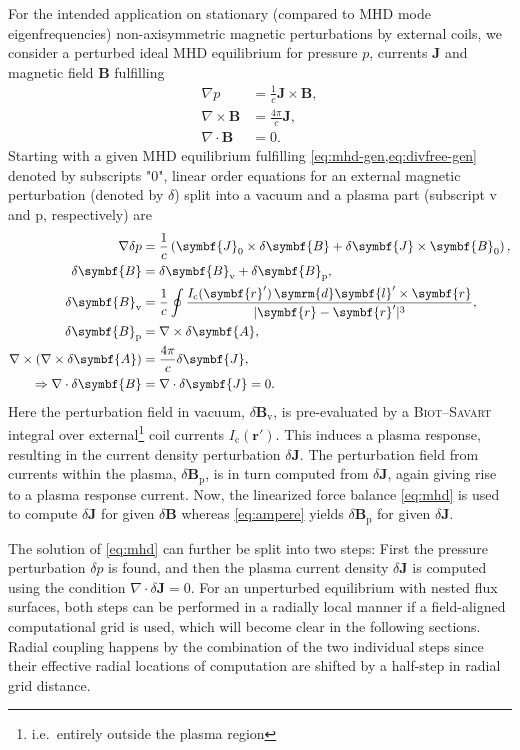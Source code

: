 \documentclass[a4paper, twoside, 10pt, english]{article}
\numberwithin{equation}{section}
\let\vec\symbf
\newcommand*\grad{\ensuremath{\nabla}}
\newcommand*\divg{\ensuremath{\nabla \cdot}}
\newcommand*\curl{\ensuremath{\nabla \times}}
\newcommand*\diff{\ensuremath{\symrm{d}}}  %
\newcommand*\Bvac{\ensuremath{\delta \vec{B}_{\text{v}}}}  %
\newcommand*\Bplas{\ensuremath{\delta \vec{B}_{\text{p}}}}  %
\newcommand*\Bpert{\ensuremath{\delta \vec{B}}}  %
\begin{document}
For the intended application on stationary (compared to MHD mode eigenfrequencies) non-axisymmetric magnetic perturbations by external coils, we consider a perturbed ideal MHD equilibrium for pressure $p$, currents $\vec{J}$ and magnetic field $\vec{B}$ fulfilling
\begin{align}
  \grad p &= \frac{1}{c} \vec{J} \times \vec{B}, \label{eq:mhd-gen} \\
  \curl \vec{B} &= \frac{4 \pi}{c} \vec{J}, \label{eq:ampere-gen} \\
  \divg \vec{B} &= 0. \label{eq:divfree-gen}
\end{align}
Starting with a given MHD equilibrium fulfilling \cref{eq:mhd-gen,eq:divfree-gen} denoted by subscripts "$0$", linear order equations for an external magnetic perturbation (denoted by $\delta$) split into a vacuum and a plasma part (subscript $\text{v}$ and $\text{p}$, respectively) are
\begin{align}
  \grad \delta p &= \frac{1}{c} \left( \vec{J}_{0} \times \Bpert + \delta \vec{J} \times \vec{B}_{0} \right), \label{eq:mhd} \\
  \Bpert &= \Bvac + \Bplas, \\
  \Bvac &= \frac{1}{c} \oint \frac{I_{\text{c}}(\vec{r}') \, \diff \vec{l}' \times \vec{r}}{\lvert \vec{r} - \vec{r}' \rvert^{3}}, \label{eq:biot-savart} \\
  \Bplas &= \curl \delta \vec{A}, \\
  \curl (\curl \delta \vec{A}) &= \frac{4 \pi}{c} \delta \vec{J}, \label{eq:ampere} \\
  \Rightarrow \divg \Bpert &= \divg \delta \vec{J} = 0. \label{eq:divfree}
\end{align}
Here the perturbation field in vacuum, $\Bvac$, is pre-evaluated by a \textsc{Biot}--\textsc{Savart} integral over external\footnote{i.e.\ entirely outside the plasma region} coil currents $I_{\text{c}} (\vec{r}')$. This induces a plasma response, resulting in the current density perturbation $\delta \vec{J}$. The perturbation field from currents within the plasma, $\Bplas$, is in turn computed from $\delta \vec{J}$, again giving rise to a plasma response current. Now, the linearized force balance \cref{eq:mhd} is used to compute $\delta \vec{J}$ for given $\Bpert$ whereas \cref{eq:ampere} yields $\Bplas$ for given $\delta \vec{J}$.

The solution of \cref{eq:mhd} can further be split into two steps: First the pressure perturbation $\delta p$ is found, and then the plasma current density $\delta \vec{J}$ is computed using the condition $\divg \delta \vec{J} = 0$. For an unperturbed equilibrium with nested flux surfaces, both steps can be performed in a radially local manner if a field-aligned computational grid is used, which will become clear in the following sections. Radial coupling happens by the combination of the two individual steps since their effective radial locations of computation are shifted by a half-step in radial grid distance.
\end{document}
